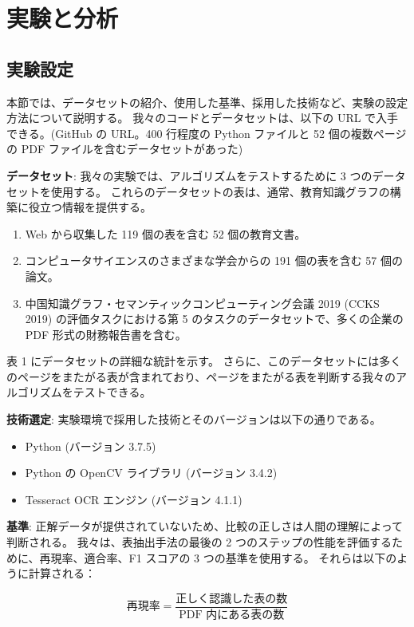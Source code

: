 \documentclass[uplatex, twocolumn,10pt]{jsarticle}
\begin{document}


\section{実験と分析}

\subsection{実験設定}
本節では、データセットの紹介、使用した基準、採用した技術など、実験の設定方法について説明する。
我々のコードとデータセットは、以下の URL で入手できる。(GitHub の URL。400 行程度の Python ファイルと 52 個の複数ページの PDF ファイルを含むデータセットがあった)

\textbf{データセット}:
我々の実験では、アルゴリズムをテストするために 3 つのデータセットを使用する。
これらのデータセットの表は、通常、教育知識グラフの構築に役立つ情報を提供する。

\begin{enumerate}
    \item Web から収集した 119 個の表を含む 52 個の教育文書。
    \item コンピュータサイエンスのさまざまな学会からの 191 個の表を含む 57 個の論文。
    \item 中国知識グラフ・セマンティックコンピューティング会議 2019 (CCKS 2019) の評価タスクにおける第 5 のタスクのデータセットで、多くの企業の PDF 形式の財務報告書を含む。
\end{enumerate}

表 1 にデータセットの詳細な統計を示す。
さらに、このデータセットには多くのページをまたがる表が含まれており、ページをまたがる表を判断する我々のアルゴリズムをテストできる。

\textbf{技術選定}:
実験環境で採用した技術とそのバージョンは以下の通りである。
\begin{itemize}
    \item Python (バージョン 3.7.5)
    \item Python の OpenCV ライブラリ (バージョン 3.4.2)
    \item Tesseract OCR エンジン (バージョン 4.1.1)
\end{itemize}

\textbf{基準}:
正解データが提供されていないため、比較の正しさは人間の理解によって判断される。
我々は、表抽出手法の最後の 2 つのステップの性能を評価するために、再現率、適合率、F1 スコアの 3 つの基準を使用する。
それらは以下のように計算される：

\begin{equation}
    \text{再現率} = \frac{\text{正しく認識した表の数}}{\text{PDF 内にある表の数}}
\end{equation}
\end{document}

